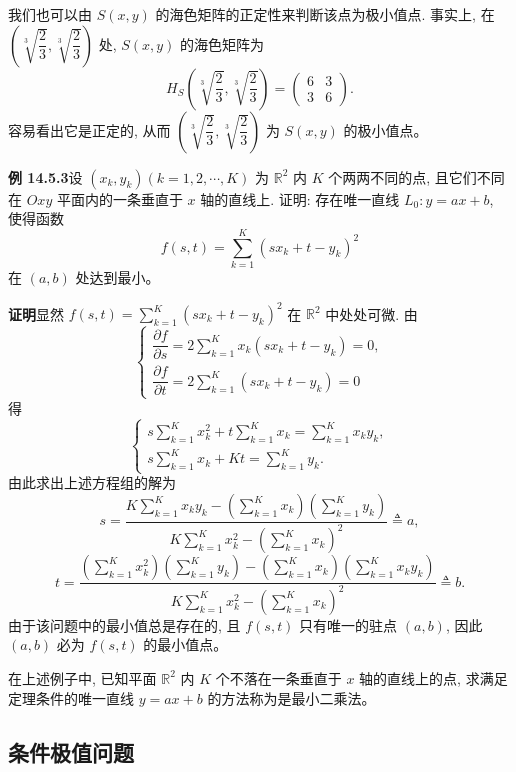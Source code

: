 \documentclass[UTF8, 12pt, fontset=fandol, oneside]{ctexart}
\begin{document}
我们也可以由 $S(x,y)$ 的海色矩阵的正定性来判断该点为极小值点. 事实上, 在 $\left(\sqrt[3]{\dfrac23},\sqrt[3]{\dfrac23}\right)$ 处, $S(x,y)$ 的海色矩阵为
\[
  H_S\left(\sqrt[3]{\frac23},\sqrt[3]{\frac23}\right)
  =
  \begin{pmatrix}
    6 & 3\\
    3 & 6
  \end{pmatrix}.
\]
容易看出它是正定的, 从而 $\left(\sqrt[3]{\dfrac23},\sqrt[3]{\dfrac23}\right)$ 为 $S(x,y)$ 的极小值点。

\noindent\textbf{例 14.5.3}\quad 设 $(x_k,y_k)(k=1,2,\cdots,K)$ 为 $\mathbb R^2$ 内 $K$ 个两两不同的点, 且它们不同在 $Oxy$ 平面内的一条垂直于 $x$ 轴的直线上. 证明: 存在唯一直线 $L_0:y=ax+b$, 使得函数
\[
  f(s,t)=\sum_{k=1}^K(sx_k+t-y_k)^2
\]
在 $(a,b)$ 处达到最小。

\noindent\textbf{证明}\quad 显然 $f(s,t)=\sum\limits_{k=1}^K(sx_k+t-y_k)^2$ 在 $\mathbb R^2$ 中处处可微. 由
\[
  \begin{cases}
    \dfrac{\partial f}{\partial s}
    =2\displaystyle\sum_{k=1}^K x_k(sx_k+t-y_k)=0,\\[1.2ex]
    \dfrac{\partial f}{\partial t}
    =2\displaystyle\sum_{k=1}^K (sx_k+t-y_k)=0
  \end{cases}
\]
得
\[
  \begin{cases}
    s\displaystyle\sum_{k=1}^K x_k^2
    +t\displaystyle\sum_{k=1}^K x_k
    =\displaystyle\sum_{k=1}^K x_ky_k,\\[1.2ex]
    s\displaystyle\sum_{k=1}^K x_k
    +Kt
    =\displaystyle\sum_{k=1}^K y_k.
  \end{cases}
\]
由此求出上述方程组的解为
\[
  s=
  \frac{
    K\displaystyle\sum_{k=1}^K x_ky_k
    -\left(\displaystyle\sum_{k=1}^K x_k\right)
     \left(\displaystyle\sum_{k=1}^K y_k\right)}
  {
    K\displaystyle\sum_{k=1}^K x_k^2
    -\left(\displaystyle\sum_{k=1}^K x_k\right)^2}
  \triangleq a,
\]
\[
  t=
  \frac{
    \left(\displaystyle\sum_{k=1}^K x_k^2\right)
    \left(\displaystyle\sum_{k=1}^K y_k\right)
    -\left(\displaystyle\sum_{k=1}^K x_k\right)
     \left(\displaystyle\sum_{k=1}^K x_ky_k\right)}
  {
    K\displaystyle\sum_{k=1}^K x_k^2
    -\left(\displaystyle\sum_{k=1}^K x_k\right)^2}
  \triangleq b.
\]
由于该问题中的最小值总是存在的, 且 $f(s,t)$ 只有唯一的驻点 $(a,b)$, 因此 $(a,b)$ 必为 $f(s,t)$ 的最小值点。

在上述例子中, 已知平面 $\mathbb R^2$ 内 $K$ 个不落在一条垂直于 $x$ 轴的直线上的点, 求满足定理条件的唯一直线 $y=ax+b$ 的方法称为是最小二乘法。

\subsection{条件极值问题}
\end{document}
